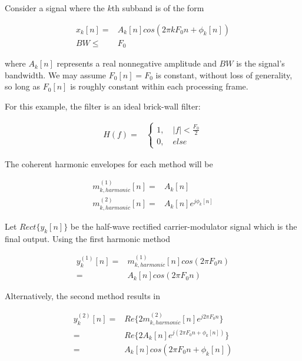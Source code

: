 \documentclass [11pt, proquest,oneside] {ganter_thesis}[2015/03/03]
\begin{document}
Consider a signal where the $k$th subband is of the form

\begin{align}
x_k[n] =& A_k[n]cos(2\pi kF_0n + \phi_k[n]) \\
BW \leq& F_0 \nonumber
\end{align}

where $A_k[n]$ represents a real nonnegative amplitude and $BW$ is the signal's bandwidth.  We may assume $F_0[n] = F_0$ is constant, without loss of generality, so long as $F_0[n]$ is roughly constant within each processing frame.

For this example, the filter is an ideal brick-wall filter:

\begin{align}
H(f) =& \left\{
                \begin{array}{ll}
                1, \quad |f| < \frac{F_0}{2} \\
			   0, \quad else \nonumber
                \end{array}
              \right.
\end{align}

The coherent harmonic envelopes for each method will be

\begin{align}
\label{eq:realVSmag1}
m^{(1)}_{k,harmonic}[n] =& A_k[n] \\
m^{(2)}_{k,harmonic}[n] =& A_k[n]e^{j\phi_k[n]}
\end{align}

Let $Rect\{y_k[n]\}$ be the half-wave rectified carrier-modulator signal which is the final output.  Using the first harmonic method

\begin{align}
y_k^{(1)}[n] =& m^{(1)}_{k,harmonic}[n] cos(2\pi F_0 n) \nonumber \\
\label{eq:phase_encode_1}
=& A_k[n] cos(2\pi F_0 n)
\end{align}

Alternatively, the second method results in

\begin{align}
y_k^{(2)}[n] =& Re\{ 2m^{(2)}_{k,harmonic}[n] e^{j2\pi F_0 n} \}  \\ \nonumber
=& Re\{ 2A_k[n]e^{j(2\pi F_0 n + \phi_k[n])} \} \nonumber \\
\label{eq:phase_encode_2}
=& A_k[n]cos(2\pi F_0 n + \phi_k[n])
\end{align}
\end{document}

